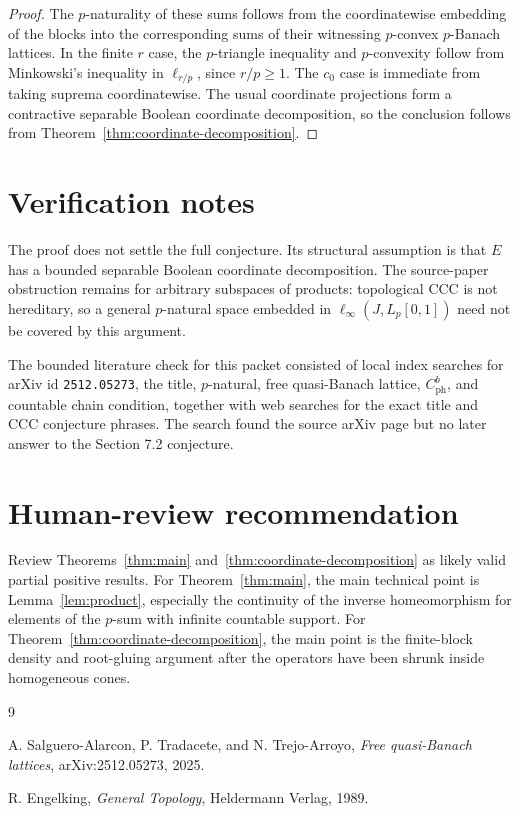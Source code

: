 \documentclass[11pt]{article}
\newcommand{\Lp}{L_p[0,1]}
\newcommand{\ph}{\mathrm{ph}}
\begin{document}
\begin{proof}
The \(p\)-naturality of these sums follows from the coordinatewise embedding
of the blocks into the corresponding sums of their witnessing \(p\)-convex
\(p\)-Banach lattices.  In the finite \(r\) case, the \(p\)-triangle
inequality and \(p\)-convexity follow from Minkowski's inequality in
\(\ell_{r/p}\), since \(r/p\geq1\).  The \(c_0\) case is immediate from
taking suprema coordinatewise.  The usual coordinate projections form a
contractive separable Boolean coordinate decomposition, so the conclusion
follows from Theorem~\ref{thm:coordinate-decomposition}.
\end{proof}

\section*{Verification notes}

The proof does not settle the full conjecture.  Its structural assumption is
that \(E\) has a bounded separable Boolean coordinate decomposition.  The
source-paper obstruction remains for arbitrary subspaces of products:
topological CCC is not hereditary, so a general \(p\)-natural space embedded
in \(\ell_\infty(J,\Lp)\) need not be covered by this argument.

The bounded literature check for this packet consisted of local index searches
for arXiv id \texttt{2512.05273}, the title, \(p\)-natural, free
quasi-Banach lattice, \(C_{\ph}^b\), and countable chain condition, together
with web searches for the exact title and CCC conjecture phrases.  The search
found the source arXiv page but no later answer to the Section 7.2 conjecture.

\section*{Human-review recommendation}

Review Theorems~\ref{thm:main} and~\ref{thm:coordinate-decomposition} as
likely valid partial positive results.  For Theorem~\ref{thm:main}, the main
technical point is Lemma~\ref{lem:product}, especially the continuity of the
inverse homeomorphism for elements of the \(p\)-sum with infinite countable
support.  For Theorem~\ref{thm:coordinate-decomposition}, the main point is
the finite-block density and root-gluing argument after the operators have
been shrunk inside homogeneous cones.

\begin{thebibliography}{9}

A. Salguero-Alarcon, P. Tradacete, and N. Trejo-Arroyo,
\emph{Free quasi-Banach lattices}, arXiv:2512.05273, 2025.

R. Engelking,
\emph{General Topology},
Heldermann Verlag, 1989.

\end{thebibliography}
\end{document}
